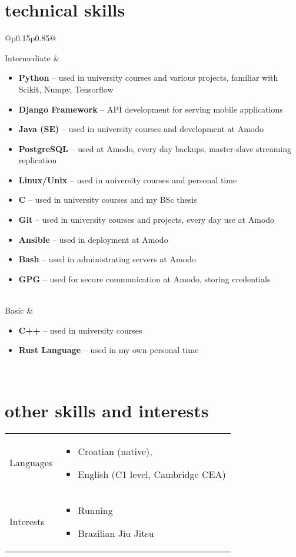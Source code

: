 \documentclass[a4paper]{article}
\makeatletter
\newlength{\tablewidth}
\newenvironment{skills}{%
\setlength{\tablewidth}{\linewidth}
\addtolength{\tablewidth}{-2\tabcolsep}
\begin{tabular}{@{}p{0.15\tablewidth}p{0.85\tablewidth}@{}}
}{%
\end{tabular}
}
\makeatother
\begin{document}
\section{technical skills}
\begin{skills}
    Intermediate &
    \begin{itemize}
        \item \textbf{Python} -- used in university courses and various projects, familiar with Scikit, Numpy, Tensorflow
        \item \textbf{Django Framework} -- API development for serving mobile applications
        \item \textbf{Java (SE)} -- used in university courses and development at Amodo 
        \item \textbf{PostgreSQL} -- used at Amodo, every day backups, master-slave streaming replication
        \item \textbf{Linux/Unix} -- used in university courses and personal time
        \item \textbf{C} -- used in university courses and my BSc thesis
        \item \textbf{Git} -- used in university courses and projects, every day use at Amodo
        \item \textbf{Ansible} -- used in deployment at Amodo
        \item \textbf{Bash} -- used in administrating servers at Amodo
        \item \textbf{GPG} -- used for secure communication at Amodo, storing credentials
    \end{itemize} \\
    Basic &
    \begin{itemize}
        \item \textbf{C++} -- used in university courses
        \item \textbf{Rust Language} -- used in my own personal time
    \end{itemize} \\
\end{skills}

\section{other skills and interests}
\begin{skills}
        Languages &
        \begin{itemize}
                \item Croatian (native),
                \item English (C1 level, Cambridge CEA)
        \end{itemize} \\
        Interests &
        \begin{itemize}
        		\item Running
		\item Brazilian Jiu Jitsu
    \end{itemize} \\
\end{skills}
\end{document}
